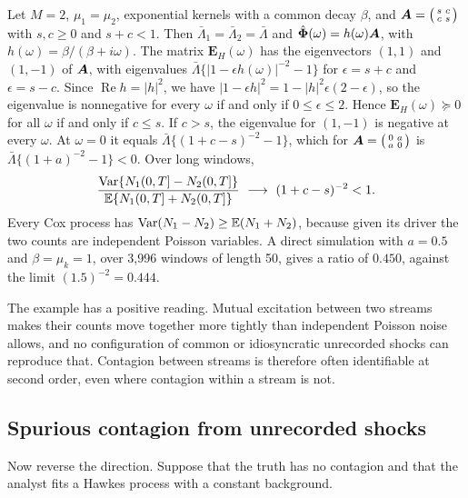 \begin{example}\label{ex:th-mv-cross}
Let $M=2$, $\mu_1=\mu_2$, exponential kernels with a common decay $\beta$, and
$\bm{A}=\bigl(\begin{smallmatrix}s&c\\c&s\end{smallmatrix}\bigr)$ with $s,c\ge0$ and $s+c<1$.
Then $\bar\Lambda_1=\bar\Lambda_2=\bar\Lambda$ and $\hat{\bm{\Phi}}(\omega)=h(\omega)\bm{A}$, with
$h(\omega)=\beta/(\beta+i\omega)$. The matrix $\bm E_H(\omega)$ has the eigenvectors
$(1,1)$ and $(1,-1)$ of $\bm{A}$, with eigenvalues
$\bar\Lambda\{|1-\epsilon h(\omega)|^{-2}-1\}$ for $\epsilon=s+c$ and $\epsilon=s-c$. Since
$\operatorname{Re}h=|h|^2$, we have $|1-\epsilon h|^2=1-|h|^2\epsilon(2-\epsilon)$, so the
eigenvalue is nonnegative for every $\omega$ if and only if $0\le\epsilon\le2$. Hence
$\bm E_H(\omega)\succeq0$ for all $\omega$ if and only if $c\le s$. If $c>s$, the eigenvalue
for $(1,-1)$ is negative at every $\omega$. At $\omega=0$ it equals
$\bar\Lambda\{(1+c-s)^{-2}-1\}$, which for
$\bm{A}=\bigl(\begin{smallmatrix}0&a\\a&0\end{smallmatrix}\bigr)$ is
$\bar\Lambda\{(1+a)^{-2}-1\}<0$. Over long windows,
\[
\frac{\Var\{N_1(0,T]-N_2(0,T]\}}{\E\{N_1(0,T]+N_2(0,T]\}}\ \longrightarrow\ (1+c-s)^{-2}<1 .
\]
Every Cox process has $\operatorname{Var}(N_1-N_2)\ge\mathbb{E}(N_1+N_2)$, because given its driver the two
counts are independent Poisson variables. A direct simulation with $a=0.5$ and
$\beta=\mu_k=1$, over 3{,}996 windows of length 50, gives a ratio of $0.450$, against the
limit $(1.5)^{-2}=0.444$.
\end{example}

The example has a positive reading. Mutual excitation between two streams makes their
counts move together more tightly than independent Poisson noise allows, and no
configuration of common or idiosyncratic unrecorded shocks can reproduce that. Contagion
between streams is therefore often identifiable at second order, even where contagion
within a stream is not.

\subsection{Spurious contagion from unrecorded shocks}\label{sec:th-spurious}

Now reverse the direction. Suppose that the truth has no contagion and that the
analyst fits a Hawkes process with a constant background.

